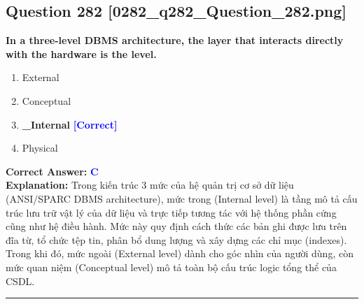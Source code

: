 \documentclass[11pt,a4paper]{article}
\begin{document}
\begin{minipage}{\textwidth}
\subsection*{Question 282 \quad \footnotesize{[0282\_q282\_Question\_282.png]}}
\noindent \textbf{In a three-level DBMS architecture, the layer that interacts directly with the hardware is the level.}

\begin{enumerate}[label=\Alph*.]
    \item External
    \item Conceptual
    \item \textbf{\_Internal} \hfill \textcolor{blue}{\textbf{[Correct]}}
    \item Physical
\end{enumerate}

\noindent \textbf{Correct Answer:} \textcolor{blue}{\textbf{C}} \\[2pt]
\noindent \textbf{Explanation:} Trong kiến trúc 3 mức của hệ quản trị cơ sở dữ liệu (ANSI/SPARC DBMS architecture), mức trong (Internal level) là tầng mô tả cấu trúc lưu trữ vật lý của dữ liệu và trực tiếp tương tác với hệ thống phần cứng cũng như hệ điều hành. Mức này quy định cách thức các bản ghi được lưu trên đĩa từ, tổ chức tệp tin, phân bổ dung lượng và xây dựng các chỉ mục (indexes). Trong khi đó, mức ngoài (External level) dành cho góc nhìn của người dùng, còn mức quan niệm (Conceptual level) mô tả toàn bộ cấu trúc logic tổng thể của CSDL.

\par\vspace{0.3cm}
\hrule
\vspace{0.3cm}
\end{minipage}
\end{document}
